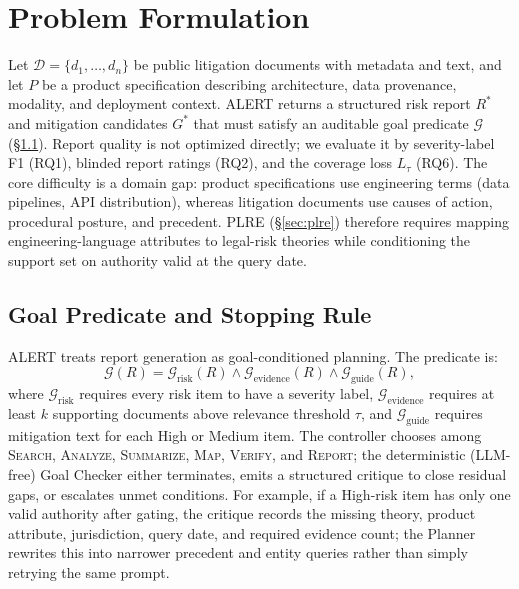 \section{Problem Formulation}
\label{sec:formulation}

Let $\mathcal{D}=\{d_1,\ldots,d_n\}$ be public litigation documents with metadata and text, and let $P$ be a product specification describing architecture, data provenance, modality, and deployment context. ALERT returns a structured risk report $R^*$ and mitigation candidates $G^*$ that must satisfy an auditable goal predicate $\mathcal{G}$ (\S\ref{sec:goal_checker}). Report quality is not optimized directly; we evaluate it by severity-label F1 (RQ1), blinded report ratings (RQ2), and the coverage loss $L_\tau$ (RQ6). The core difficulty is a domain gap: product specifications use engineering terms (data pipelines, API distribution), whereas litigation documents use causes of action, procedural posture, and precedent. PLRE (\S\ref{sec:plre}) therefore requires mapping engineering-language attributes to legal-risk theories while conditioning the support set on authority valid at the query date.

\subsection{Goal Predicate and Stopping Rule}
\label{sec:goal_checker}

ALERT treats report generation as goal-conditioned planning. The predicate is:
\begin{equation}
\label{eq:goal_predicate}
  \mathcal{G}(R)=\mathcal{G}_{\text{risk}}(R)\wedge\mathcal{G}_{\text{evidence}}(R)\wedge\mathcal{G}_{\text{guide}}(R),
\end{equation}
where $\mathcal{G}_{\text{risk}}$ requires every risk item to have a severity label, $\mathcal{G}_{\text{evidence}}$ requires at least $k$ supporting documents above relevance threshold $\tau$, and $\mathcal{G}_{\text{guide}}$ requires mitigation text for each High or Medium item. The controller chooses among \textsc{Search}, \textsc{Analyze}, \textsc{Summarize}, \textsc{Map}, \textsc{Verify}, and \textsc{Report}; the deterministic (LLM-free) Goal Checker either terminates, emits a structured critique to close residual gaps, or escalates unmet conditions. For example, if a High-risk item has only one valid authority after gating, the critique records the missing theory, product attribute, jurisdiction, query date, and required evidence count; the Planner rewrites this into narrower precedent and entity queries rather than simply retrying the same prompt.


